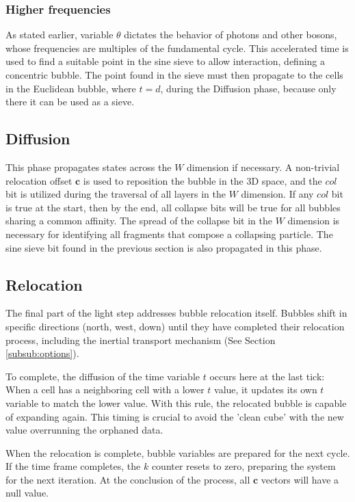 \documentclass[12pt,english]{article}
\begin{document}
\subsubsection{Higher frequencies}
As stated earlier, variable $\theta$ dictates the behavior of photons and other bosons, whose frequencies are multiples of the fundamental cycle. This accelerated time is used to find a suitable point in the sine sieve to allow interaction, defining a concentric bubble. The point found in the sieve must then propagate to the cells in the Euclidean bubble, where $t=d$, during the Diffusion phase, because only there it can be used as a sieve.

\subsection{Diffusion}  
This phase propagates states across the \(W\) dimension if necessary. A non-trivial relocation offset \(\boldsymbol{c}\) is used to reposition the bubble in the 3D space, and the \(col\) bit is utilized during the traversal of all layers in the \(W\) dimension. If any \(col\) bit is true at the start, then by the end, all collapse bits will be true for all bubbles sharing a common affinity. The spread of the collapse bit in the \(W\) dimension is necessary for identifying all fragments that compose a collapsing particle. The sine sieve bit found in the previous section is also propagated in this phase.

\subsection{Relocation} \label{subsec:relocation}
The final part of the light step addresses bubble relocation itself. Bubbles shift in specific directions (north, west, down) until they have completed their relocation process, including the inertial transport mechanism (See Section \ref{subsub:options}).

To complete, the diffusion of the time variable $t$ occurs here at the last tick: When a cell has a neighboring cell with a lower $t$ value, it updates its own $t$ variable to match the lower value. With this rule, the relocated bubble is capable of expanding again. This timing is crucial to avoid the 'clean cube' with the new value overrunning the orphaned data.

When the relocation is complete, bubble variables are prepared for the next cycle. If the time frame completes, the $k$ counter resets to zero, preparing the system for the next iteration.  At the conclusion of the process, all $\boldsymbol{c}$ vectors will have a null value.
\end{document}
